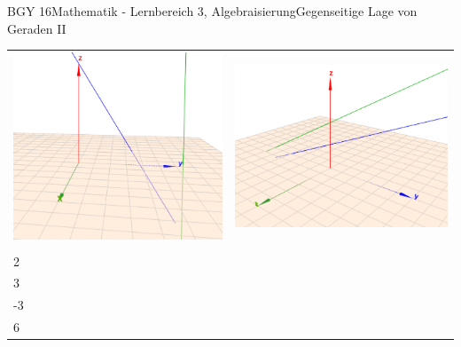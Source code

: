 \documentclass[oneside,openany,headings=optiontotoc,11pt,numbers=noenddot]{scrreprt}
\begin{document}
\begin{worksheet}{BGY 16}{Mathematik - Lernbereich 3, Algebraisierung}{Gegenseitige Lage von Geraden II}
\begin{framed}
\begin{center}
\begin{tabularx}{\textwidth}{X|X}
					\includegraphics[scale=0.55]{Bilder/ghWindschief3D.png} & \includegraphics[scale=0.55]{Bilder/ghParallel3D.png}\\
					\(g_1: \vec{x} = \left(\begin{array}{c}1\\2\\3\end{array}\right) + r\left(\begin{array}{c}9\\-3\\6\end{array}\right)\) & 

\end{tabularx}
\end{center}
\end{framed}
\end{worksheet}
\end{document}
